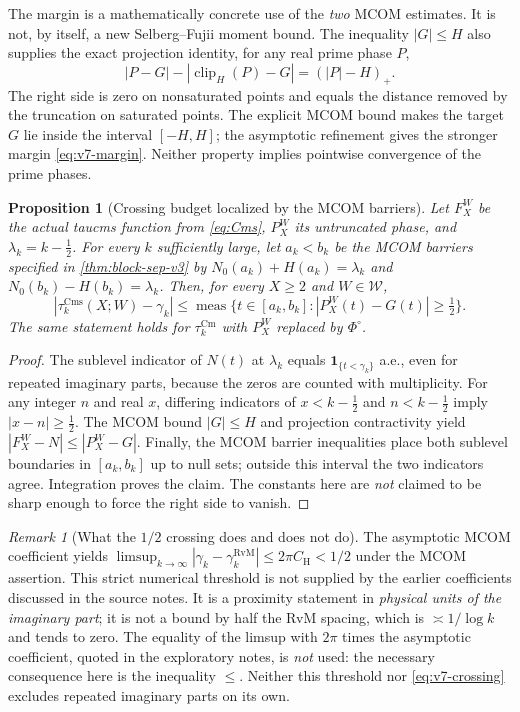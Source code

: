 \documentclass[11pt,a4paper]{article}
\numberwithin{equation}{section}
\newtheorem{proposition}[theorem]{Proposition}
\theoremstyle{definition}
\theoremstyle{remark}
\newtheorem{remark}[theorem]{Remark}
\newcommand{\meas}{\operatorname{meas}}
\newcommand{\clip}{\operatorname{clip}}
\newcommand{\Cm}{\mathrm{Cm}}
\newcommand{\Cms}{\mathrm{Cms}}
\begin{document}
The margin is a mathematically concrete use of the \emph{two}
MCOM estimates. It is not, by itself, a new Selberg--Fujii moment
bound. The inequality $|G|\le H$ also supplies the exact projection
identity, for any real prime phase $P$,
\begin{equation}\label{eq:v7-exact-projection}
 |P-G|-|\clip_H(P)-G|=(|P|-H)_+.
\end{equation}
The right side is zero on nonsaturated points and equals the distance
removed by the truncation on saturated points. The explicit MCOM
bound makes the target $G$ lie inside the interval $[-H,H]$; the
asymptotic refinement gives the stronger margin
\eqref{eq:v7-margin}. Neither property implies pointwise
convergence of the prime phases.

\begin{proposition}[Crossing budget localized by the MCOM barriers]
\label{prop:v7-crossing}
Let $F_X^W$ be the actual taucms function from \eqref{eq:Cms},
$P_X^W$ its \emph{untruncated} phase, and
$\lambda_k=k-\tfrac12$. For every $k$ sufficiently large, let
$a_k<b_k$ be the MCOM barriers specified in
\cref{thm:block-sep-v3} by
$N_0(a_k)+H(a_k)=\lambda_k$ and
$N_0(b_k)-H(b_k)=\lambda_k$.
Then, for every $X\ge2$ and $W\in\mathcal W$,
\begin{equation}\label{eq:v7-crossing}
 |\tau_k^{\Cms}(X;W)-\gamma_k|
 \le \meas\bigl\{t\in[a_k,b_k]:
 |P_X^W(t)-G(t)|\ge\tfrac12\bigr\}.
\end{equation}
The same statement holds for $\tau_k^{\Cm}$ with $P_X^W$
replaced by $\Phi^\circ$.
\end{proposition}
\begin{proof}
The sublevel indicator of $N(t)$ at $\lambda_k$ equals
$\mathbf1_{\{t<\gamma_k\}}$ a.e., even for repeated imaginary parts,
because the zeros are counted with multiplicity. For any integer $n$
and real $x$, differing indicators of $x<k-\frac12$ and
$n<k-\frac12$ imply $|x-n|\ge\frac12$.
The MCOM bound $|G|\le H$ and projection contractivity yield
$|F_X^W-N|\le|P_X^W-G|$. Finally, the MCOM barrier inequalities
place both sublevel boundaries in $[a_k,b_k]$ up to null sets;
outside this interval the two indicators agree. Integration
proves the claim. The constants here are \emph{not} claimed to
be sharp enough to force the right side to vanish.
\end{proof}

\begin{remark}[What the $1/2$ crossing does and does not do]
The asymptotic MCOM coefficient yields
$\limsup_{k\to\infty}|\gamma_k-\gamma_k^{\mathrm{RvM}}|
\le2\pi C_{\mathrm H}<1/2$ under the MCOM assertion.
This strict numerical threshold is not supplied by the earlier
coefficients discussed in the source notes. It is a proximity
statement in \emph{physical units of the imaginary part}; it is not a bound by
half the RvM spacing, which is $\asymp1/\log k$ and tends to zero.
The equality of the limsup with $2\pi$ times the asymptotic coefficient, quoted in the exploratory
notes, is \emph{not} used: the necessary consequence here is the
inequality $\le$. Neither this threshold nor
\eqref{eq:v7-crossing} excludes repeated imaginary parts on its own.
\end{remark}
\end{document}
